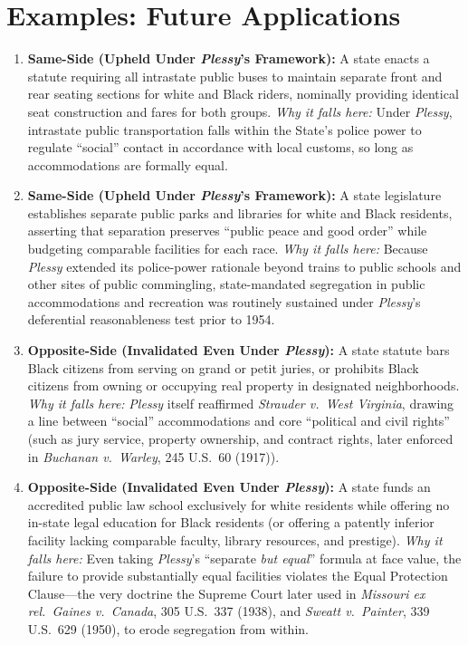\documentclass[12pt]{article}
\begin{document}
\section{Examples: Future Applications}

\begin{enumerate}
\item \textbf{Same-Side (Upheld Under \textit{Plessy}'s Framework):} A state enacts a statute requiring all intrastate public buses to maintain separate front and rear seating sections for white and Black riders, nominally providing identical seat construction and fares for both groups. \textit{Why it falls here:} Under \textit{Plessy}, intrastate public transportation falls within the State's police power to regulate ``social'' contact in accordance with local customs, so long as accommodations are formally equal.
\item \textbf{Same-Side (Upheld Under \textit{Plessy}'s Framework):} A state legislature establishes separate public parks and libraries for white and Black residents, asserting that separation preserves ``public peace and good order'' while budgeting comparable facilities for each race. \textit{Why it falls here:} Because \textit{Plessy} extended its police-power rationale beyond trains to public schools and other sites of public commingling, state-mandated segregation in public accommodations and recreation was routinely sustained under \textit{Plessy}'s deferential reasonableness test prior to 1954.
\item \textbf{Opposite-Side (Invalidated Even Under \textit{Plessy}):} A state statute bars Black citizens from serving on grand or petit juries, or prohibits Black citizens from owning or occupying real property in designated neighborhoods. \textit{Why it falls here:} \textit{Plessy} itself reaffirmed \textit{Strauder v.\ West Virginia}, drawing a line between ``social'' accommodations and core ``political and civil rights'' (such as jury service, property ownership, and contract rights, later enforced in \textit{Buchanan v.\ Warley}, 245 U.S.\ 60 (1917)).
\item \textbf{Opposite-Side (Invalidated Even Under \textit{Plessy}):} A state funds an accredited public law school exclusively for white residents while offering no in-state legal education for Black residents (or offering a patently inferior facility lacking comparable faculty, library resources, and prestige). \textit{Why it falls here:} Even taking \textit{Plessy}'s ``separate \textit{but equal}'' formula at face value, the failure to provide substantially equal facilities violates the Equal Protection Clause---the very doctrine the Supreme Court later used in \textit{Missouri ex rel.\ Gaines v.\ Canada}, 305 U.S.\ 337 (1938), and \textit{Sweatt v.\ Painter}, 339 U.S.\ 629 (1950), to erode segregation from within.

\end{enumerate}
\end{document}
